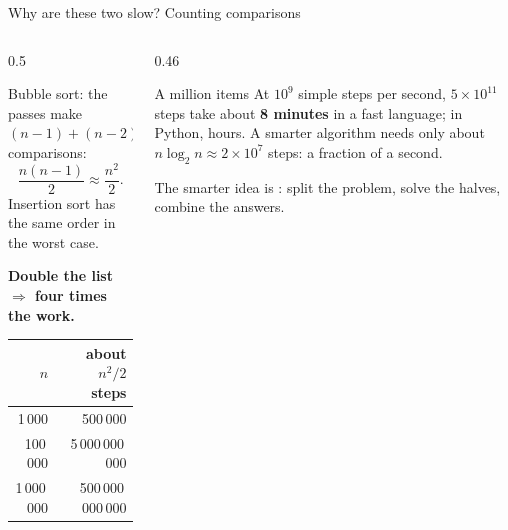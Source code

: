 \documentclass[aspectratio=169,10pt]{beamer}
\begin{document}
\begin{frame}{Why are these two slow? Counting comparisons}
\begin{columns}[T]
\begin{column}{0.5\textwidth}
{\small
Bubble sort: the passes make $(n-1)+(n-2)+\dots+1$ comparisons:
\[\frac{n(n-1)}{2}\approx\frac{n^2}{2}.\]
Insertion sort has the same order in the worst case.

\vspace{2mm}
\textbf{Double the list $\Rightarrow$ four times the work.}}
\vspace{2mm}

\renewcommand{\arraystretch}{1.2}\small
\begin{tabular}{@{}rr@{}}
\toprule
$n$ & about $n^2/2$ steps\\\midrule
1\,000 & 500\,000\\
100\,000 & 5\,000\,000\,000\\
1\,000\,000 & 500\,000\,000\,000\\
\bottomrule
\end{tabular}
\end{column}
\begin{column}{0.46\textwidth}
\begin{alertblock}{A million items}
{\small At $10^9$ simple steps per second, $5\times10^{11}$ steps take about \textbf{8 minutes} in a fast language; in Python, hours. A smarter algorithm needs only about $n\log_2 n\approx 2\times10^7$ steps: a fraction of a second.}
\end{alertblock}
\vspace{2mm}
{\small The smarter idea is : split the problem, solve the halves, combine the answers.}
\end{column}
\end{columns}
\end{frame}
\end{document}
